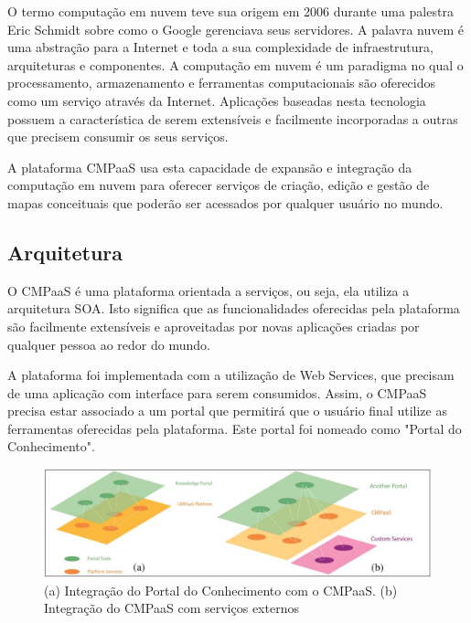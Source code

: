 \documentclass[
	12pt,				%
	openright,			%
	oneside,			%
	a4paper,			%
	english,			%
	french,				%
	spanish,			%
	brazil				%
	]{abntex2}
\begin{document}
O termo computação em nuvem teve sua origem em 2006 durante uma palestra Eric Schmidt sobre como o Google gerenciava seus servidores\cite{taurion2009}. A palavra nuvem é uma abstração para a Internet e toda a sua complexidade de infraestrutura, arquiteturas e componentes. A computação em nuvem é um paradigma no qual o processamento, armazenamento e ferramentas computacionais são oferecidos como um serviço através da Internet. Aplicações baseadas nesta tecnologia possuem a característica de serem extensíveis e facilmente incorporadas a outras que precisem consumir os seus serviços\cite{Perin2014}.

A plataforma CMPaaS usa esta capacidade de expansão e integração da computação em nuvem para oferecer serviços de criação, edição e gestão de mapas conceituais que poderão ser acessados por qualquer usuário no mundo.

\subsection{Arquitetura}

O CMPaaS é uma plataforma orientada a serviços, ou seja, ela utiliza a arquitetura SOA. Isto significa que as funcionalidades oferecidas pela plataforma são facilmente extensíveis e aproveitadas por novas aplicações criadas por qualquer pessoa ao redor do mundo. 

A plataforma foi implementada com a utilização de Web Services, que precisam de uma aplicação com interface para serem consumidos. Assim, o CMPaaS precisa estar associado a um portal que permitirá que o usuário final utilize as ferramentas oferecidas pela plataforma. Este portal foi nomeado como "Portal do Conhecimento"\cite{Perin2014}. 


\begin{figure}[htb]
	\caption{\label{fig_cmpaas}(a) Integração do Portal do Conhecimento com o CMPaaS. (b) Integração do CMPaaS com serviços externos}
	\begin{center}
		\includegraphics[scale=0.3]{cmpaas.png}
	\end{center}
\end{figure}
\end{document}
